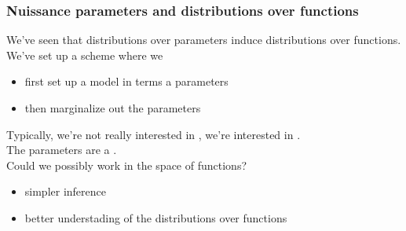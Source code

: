\begin{frame}
\frametitle{Nuissance parameters and distributions over functions}

We've seen that distributions over parameters induce distributions
over functions.\\[1ex]

We've set up a scheme where we
\begin{itemize}
\item first set up a model in terms a parameters
\item then marginalize out the parameters
\end{itemize}
Typically, we're not really interested in , we're interested
in .\\[1ex]

The parameters are a .\\[1ex]

Could we possibly work  in the space of functions?
\begin{itemize}
\item simpler inference
\item better understading of the distributions over functions
\end{itemize}
\end{frame}



